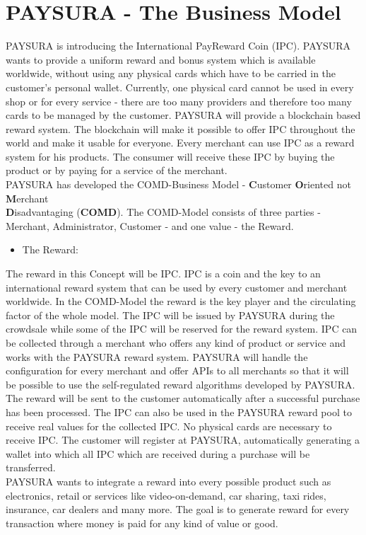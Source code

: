 \documentclass[twoside,onecolumn]{article}
\begin{document}
\newpage


\section{PAYSURA - The Business Model}

PAYSURA is introducing the International PayReward Coin (IPC). PAYSURA wants to provide a uniform reward and bonus system which is available worldwide, without using any physical cards which have to be carried in the customer's personal wallet. Currently, one physical card cannot be used in every shop or for every service - there are too many providers and therefore too many cards to be managed by the customer. PAYSURA will provide a blockchain based reward system. The blockchain will make it possible to offer IPC throughout the world and make it usable for everyone. Every merchant can use IPC as a reward system for his products. The consumer will receive these IPC by buying the product or by paying for a service of the merchant.
\\
PAYSURA has developed the COMD-Business Model - \textbf{C}ustomer \textbf{O}riented not \textbf{M}erchant \\
\textbf{D}isadvantaging (\textbf{COMD}). 
The COMD-Model consists of three parties - Merchant, Administrator, Customer - and one value - the Reward.

\begin{itemize}
\item The Reward:
\end{itemize}
The reward in this Concept will be IPC. IPC is a coin and the key to an international reward system that can be used by every customer and merchant worldwide. In the COMD-Model the reward is the key player and the circulating factor of the whole model. The IPC will be issued by PAYSURA during the crowdsale while some of the IPC will be reserved for the reward system. IPC can be collected through a merchant who offers any kind of product or service and works with the PAYSURA reward system. PAYSURA will handle the configuration for every merchant and offer APIs to all merchants so that it will be possible to use the self-regulated reward algorithms developed by PAYSURA. The reward will be sent to the customer automatically after a successful purchase has been processed. The IPC can also be used in the PAYSURA reward pool to receive real values for the collected IPC. No physical cards are necessary to receive IPC. The customer will register at PAYSURA, automatically generating a wallet into which all IPC which are received during a purchase will be transferred.\\
PAYSURA wants to integrate a reward into every possible product such as electronics, retail or services like video-on-demand, car sharing, taxi rides, insurance, car dealers and many more. The goal is to generate reward for every transaction where money is paid for any kind of value or good. 
\end{document}
